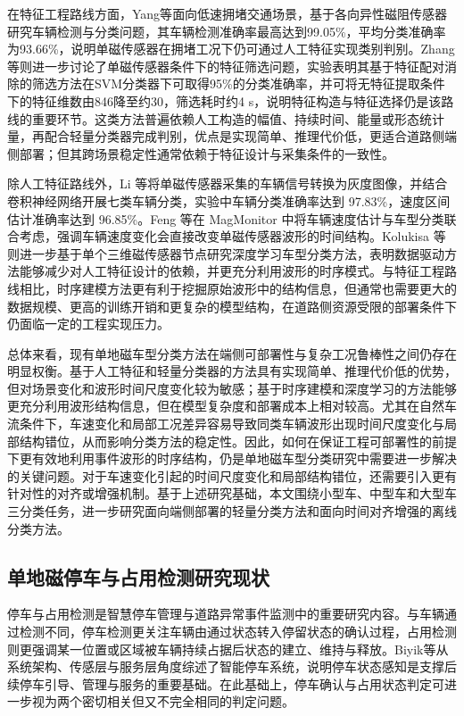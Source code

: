 \documentclass{xdupgthesis}
\begin{document}
在特征工程路线方面，Yang等\cite{R20}面向低速拥堵交通场景，基于各向异性磁阻传感器研究车辆检测与分类问题，其车辆检测准确率最高达到99.05\%，平均分类准确率为93.66\%，说明单磁传感器在拥堵工况下仍可通过人工特征实现类别判别。Zhang等\cite{ch3_zhang2019featureselection}则进一步讨论了单磁传感器条件下的特征筛选问题，实验表明其基于特征配对消除的筛选方法在SVM分类器下可取得95\%的分类准确率，并可将无特征提取条件下的特征维数由846降至约30，筛选耗时约4 s，说明特征构造与特征选择仍是该路线的重要环节。这类方法普遍依赖人工构造的幅值、持续时间、能量或形态统计量，再配合轻量分类器完成判别，优点是实现简单、推理代价低，更适合道路侧端侧部署；但其跨场景稳定性通常依赖于特征设计与采集条件的一致性。

除人工特征路线外，Li 等\cite{ch3_li2020singlemag}将单磁传感器采集的车辆信号转换为灰度图像，并结合卷积神经网络开展七类车辆分类，实验中车辆分类准确率达到 97.83\%，速度区间估计准确率达到 96.85\%。Feng 等\cite{feng2022magmonitor}在 MagMonitor 中将车辆速度估计与车型分类联合考虑，强调车辆速度变化会直接改变单磁传感器波形的时间结构。Kolukisa 等\cite{R26}则进一步基于单个三维磁传感器节点研究深度学习车型分类方法，表明数据驱动方法能够减少对人工特征设计的依赖，并更充分利用波形的时序模式。与特征工程路线相比，时序建模方法更有利于挖掘原始波形中的结构信息，但通常也需要更大的数据规模、更高的训练开销和更复杂的模型结构，在道路侧资源受限的部署条件下仍面临一定的工程实现压力。

总体来看，现有单地磁车型分类方法在端侧可部署性与复杂工况鲁棒性之间仍存在明显权衡。基于人工特征和轻量分类器的方法具有实现简单、推理代价低的优势，但对场景变化和波形时间尺度变化较为敏感；基于时序建模和深度学习的方法能够更充分利用波形结构信息，但在模型复杂度和部署成本上相对较高。尤其在自然车流条件下，车速变化和局部工况差异容易导致同类车辆波形出现时间尺度变化与局部结构错位，从而影响分类方法的稳定性。因此，如何在保证工程可部署性的前提下更有效地利用事件波形的时序结构，仍是单地磁车型分类研究中需要进一步解决的关键问题。对于车速变化引起的时间尺度变化和局部结构错位，还需要引入更有针对性的对齐或增强机制。基于上述研究基础，本文围绕小型车、中型车和大型车三分类任务，进一步研究面向端侧部署的轻量分类方法和面向时间对齐增强的离线分类方法。

\subsection{单地磁停车与占用检测研究现状}
\label{sec:related_parking_detection}

停车与占用检测是智慧停车管理与道路异常事件监测中的重要研究内容。与车辆通过检测不同，停车检测更关注车辆由通过状态转入停留状态的确认过程，占用检测则更强调某一位置或区域被车辆持续占据后状态的建立、维持与释放。Biyik等\cite{ch4_biyik2021smartparking}从系统架构、传感层与服务层角度综述了智能停车系统，说明停车状态感知是支撑后续停车引导、管理与服务的重要基础。在此基础上，停车确认与占用状态判定可进一步视为两个密切相关但又不完全相同的判定问题。
\end{document}
